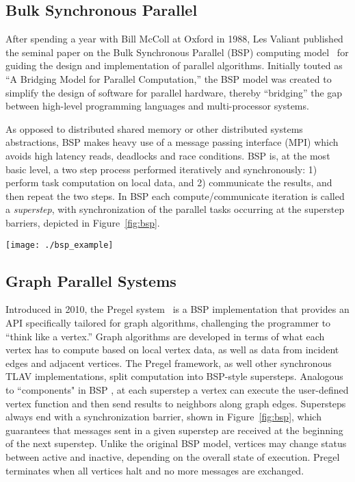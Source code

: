 \documentclass[reprint,twocolumn,showpacs,preprintnumbers,amsmath, aps,pre,amssymb]{revtex4-1}
\begin{document}
\subsection{Bulk Synchronous Parallel}

After spending a year with Bill McColl at Oxford in 1988, Les Valiant published the seminal paper on the Bulk Synchronous Parallel (BSP) computing model~\cite{Valiant1990} for guiding the design and implementation of parallel algorithms. Initially touted as ``A Bridging Model for Parallel Computation,'' the BSP model was created to simplify the design of software for parallel hardware, thereby ``bridging'' the gap between high-level programming languages and multi-processor systems. 

As opposed to distributed shared memory or other distributed systems abstractions, BSP makes heavy use of a message passing interface (MPI) which avoids high latency reads, deadlocks and race conditions. BSP is, at the most basic level, a two step process performed iteratively and synchronously: 1) perform task computation on local data, and 2) communicate the results, and then repeat the two steps. In BSP each compute/communicate iteration is called a {\em superstep}, with synchronization of the parallel tasks occurring at the superstep barriers, depicted in Figure~\ref{fig:bsp}.

\begin{figure*}[!ht]
\centering
\texttt{[image: ./bsp\_example]}
\caption{Example of Bulk Synchronous Parallel execution with 3 tasks/workers over 4 supersteps. Each task may have varying durations after which messages are passed. The barriers control synchronization across the entire system.}
\label{fig:bsp}
\end{figure*}

\subsection{Graph Parallel Systems}

Introduced in 2010, the Pregel system~\cite{Malewicz2010} is a BSP implementation that provides an API specifically tailored for graph algorithms, challenging the programmer to ``think like a vertex.'' Graph algorithms are developed in terms of what each vertex has to compute based on local vertex data, as well as data from incident edges and adjacent vertices.  The Pregel framework, as well other synchronous TLAV implementations, split computation into BSP-style supersteps. Analogous to ``components" in BSP \cite{Valiant1990}, at each superstep a vertex can execute the user-defined vertex function and then send results to neighbors along graph edges. Supersteps always end with a synchronization barrier, shown in Figure~\ref{fig:bsp}, which guarantees that messages sent in a given superstep are received at the beginning of the next superstep. Unlike the original BSP model, vertices may change status between active and inactive, depending on the overall state of execution. Pregel terminates when all vertices halt and no more messages are exchanged.
\end{document}

